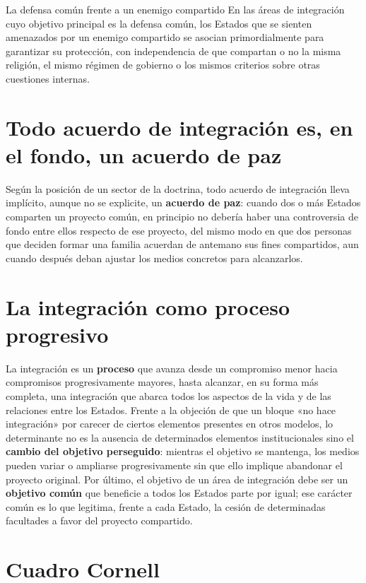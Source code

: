 \documentclass[12pt,oneside]{book}
\begin{document}
\begin{ejemplo}{La defensa común frente a un enemigo compartido}
En las áreas de integración cuyo objetivo principal es la defensa común, los Estados que se sienten amenazados por un enemigo compartido se asocian primordialmente para garantizar su protección, con independencia de que compartan o no la misma religión, el mismo régimen de gobierno o los mismos criterios sobre otras cuestiones internas.
\end{ejemplo}

\section{Todo acuerdo de integración es, en el fondo, un acuerdo de paz}

Según la posición de un sector de la doctrina, todo acuerdo de integración lleva implícito, aunque no se explicite, un \textbf{acuerdo de paz}: cuando dos o más Estados comparten un proyecto común, en principio no debería haber una controversia de fondo entre ellos respecto de ese proyecto, del mismo modo en que dos personas que deciden formar una familia acuerdan de antemano sus fines compartidos, aun cuando después deban ajustar los medios concretos para alcanzarlos.

\section{La integración como proceso progresivo}

La integración es un \textbf{proceso} que avanza desde un compromiso menor hacia compromisos progresivamente mayores, hasta alcanzar, en su forma más completa, una integración que abarca todos los aspectos de la vida y de las relaciones entre los Estados. Frente a la objeción de que un bloque «no hace integración» por carecer de ciertos elementos presentes en otros modelos, lo determinante no es la ausencia de determinados elementos institucionales sino el \textbf{cambio del objetivo perseguido}: mientras el objetivo se mantenga, los medios pueden variar o ampliarse progresivamente sin que ello implique abandonar el proyecto original. Por último, el objetivo de un área de integración debe ser un \textbf{objetivo común} que beneficie a todos los Estados parte por igual; ese carácter común es lo que legitima, frente a cada Estado, la cesión de determinadas facultades a favor del proyecto compartido.

\section{Cuadro Cornell}
\end{document}
